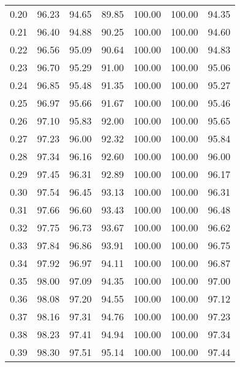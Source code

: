 \begin{tabular}{|c|c|c|c|c|c|c|}
      0.20 &     96.23 &     94.65 &      89.85 &  100.00 &     100.00 &         94.35 \\
      0.21 &     96.40 &     94.88 &      90.25 &  100.00 &     100.00 &         94.60 \\
      0.22 &     96.56 &     95.09 &      90.64 &  100.00 &     100.00 &         94.83 \\
      0.23 &     96.70 &     95.29 &      91.00 &  100.00 &     100.00 &         95.06 \\
      0.24 &     96.85 &     95.48 &      91.35 &  100.00 &     100.00 &         95.27 \\
      0.25 &     96.97 &     95.66 &      91.67 &  100.00 &     100.00 &         95.46 \\
      0.26 &     97.10 &     95.83 &      92.00 &  100.00 &     100.00 &         95.65 \\
      0.27 &     97.23 &     96.00 &      92.32 &  100.00 &     100.00 &         95.84 \\
      0.28 &     97.34 &     96.16 &      92.60 &  100.00 &     100.00 &         96.00 \\
      0.29 &     97.45 &     96.31 &      92.89 &  100.00 &     100.00 &         96.17 \\
      0.30 &     97.54 &     96.45 &      93.13 &  100.00 &     100.00 &         96.31 \\
      0.31 &     97.66 &     96.60 &      93.43 &  100.00 &     100.00 &         96.48 \\
      0.32 &     97.75 &     96.73 &      93.67 &  100.00 &     100.00 &         96.62 \\
      0.33 &     97.84 &     96.86 &      93.91 &  100.00 &     100.00 &         96.75 \\
      0.34 &     97.92 &     96.97 &      94.11 &  100.00 &     100.00 &         96.87 \\
      0.35 &     98.00 &     97.09 &      94.35 &  100.00 &     100.00 &         97.00 \\
      0.36 &     98.08 &     97.20 &      94.55 &  100.00 &     100.00 &         97.12 \\
      0.37 &     98.16 &     97.31 &      94.76 &  100.00 &     100.00 &         97.23 \\
      0.38 &     98.23 &     97.41 &      94.94 &  100.00 &     100.00 &         97.34 \\
      0.39 &     98.30 &     97.51 &      95.14 &  100.00 &     100.00 &         97.44 \\

\end{tabular}
